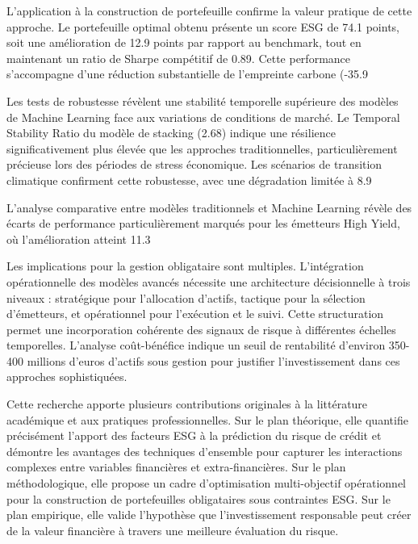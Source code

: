 L'application à la construction de portefeuille confirme la valeur pratique de cette approche. Le portefeuille optimal obtenu présente un score ESG de 74.1 points, soit une amélioration de 12.9 points par rapport au benchmark, tout en maintenant un ratio de Sharpe compétitif de 0.89. Cette performance s'accompagne d'une réduction substantielle de l'empreinte carbone (-35.9%

Les tests de robustesse révèlent une stabilité temporelle supérieure des modèles de Machine Learning face aux variations de conditions de marché. Le Temporal Stability Ratio du modèle de stacking (2.68) indique une résilience significativement plus élevée que les approches traditionnelles, particulièrement précieuse lors des périodes de stress économique. Les scénarios de transition climatique confirment cette robustesse, avec une dégradation limitée à 8.9%

L'analyse comparative entre modèles traditionnels et Machine Learning révèle des écarts de performance particulièrement marqués pour les émetteurs High Yield, où l'amélioration atteint 11.3%

Les implications pour la gestion obligataire sont multiples. L'intégration opérationnelle des modèles avancés nécessite une architecture décisionnelle à trois niveaux : stratégique pour l'allocation d'actifs, tactique pour la sélection d'émetteurs, et opérationnel pour l'exécution et le suivi. Cette structuration permet une incorporation cohérente des signaux de risque à différentes échelles temporelles. L'analyse coût-bénéfice indique un seuil de rentabilité d'environ 350-400 millions d'euros d'actifs sous gestion pour justifier l'investissement dans ces approches sophistiquées.

Cette recherche apporte plusieurs contributions originales à la littérature académique et aux pratiques professionnelles. Sur le plan théorique, elle quantifie précisément l'apport des facteurs ESG à la prédiction du risque de crédit et démontre les avantages des techniques d'ensemble pour capturer les interactions complexes entre variables financières et extra-financières. Sur le plan méthodologique, elle propose un cadre d'optimisation multi-objectif opérationnel pour la construction de portefeuilles obligataires sous contraintes ESG. Sur le plan empirique, elle valide l'hypothèse que l'investissement responsable peut créer de la valeur financière à travers une meilleure évaluation du risque.

